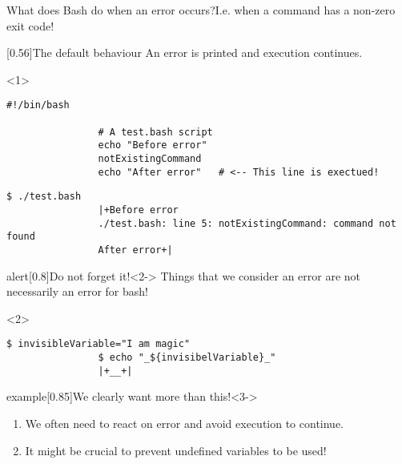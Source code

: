 \begin{frame}[fragile]{What does Bash do when an error occurs?}{I.e. when a command has a non-zero exit code!}
    \vspace{-6mm}
    \begin{overlayarea}{\textwidth}{0.7\textheight}
        \begin{varblock}{}[0.56\textwidth]{The default behaviour}
            An error is printed and \alert{execution continues}.
        \end{varblock}
        \begin{onlyenv}<1>
            \begin{lstlisting}[style=myBash, numbers=none, aboveskip=5mm]
                #!/bin/bash

                # A test.bash script
                echo "Before error"
                notExistingCommand
                echo "After error"   # <-- This line is exectued!
            \end{lstlisting}
            \begin{lstlisting}[style=myBash, numbers=none, aboveskip=2mm]
                $ ./test.bash
                |+Before error
                ./test.bash: line 5: notExistingCommand: command not found
                After error+|
            \end{lstlisting}
        \end{onlyenv}
        \begin{varblock}{alert}[0.8\textwidth]{Do not forget it!}<2->
            Things that we consider an error are not necessarily an error for bash!
        \end{varblock}
        \begin{onlyenv}<2>
            \begin{lstlisting}[style=myBash, numbers=none, aboveskip=5mm]
                $ invisibleVariable="I am magic"
                $ echo "_${invisibelVariable}_"
                |+__+|
            \end{lstlisting}
        \end{onlyenv}
        \begin{varblock}{example}[0.85\textwidth]{We clearly want more than this!}<3->
            \begin{enumerate}
                \item We often need to react on error and avoid execution to continue.
                \item It might be crucial to prevent undefined variables to be used!
            \end{enumerate}

\end{varblock}
\end{overlayarea}
\end{frame}
